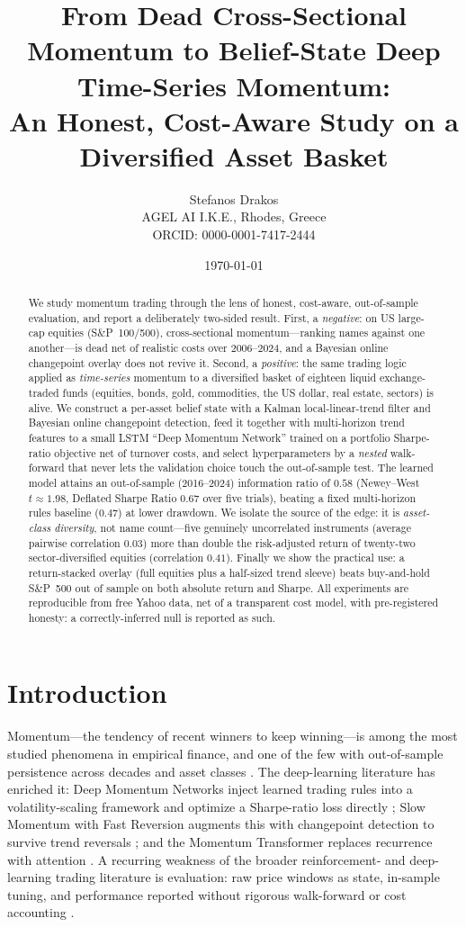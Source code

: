 \documentclass[11pt,a4paper]{article}
\title{\textbf{From Dead Cross-Sectional Momentum to Belief-State Deep\\
Time-Series Momentum:\\
An Honest, Cost-Aware Study on a Diversified Asset Basket}}
\author{Stefanos Drakos\\
\small AGEL AI I.K.E., Rhodes, Greece\\
\small ORCID: 0000-0001-7417-2444}
\date{\today}
\theoremstyle{definition}
\begin{document}
\maketitle

\begin{abstract}
We study momentum trading through the lens of honest, cost-aware, out-of-sample evaluation,
and report a deliberately two-sided result. First, a \emph{negative}: on US large-cap equities
(S\&P~100/500), cross-sectional momentum---ranking names against one another---is dead net of
realistic costs over 2006--2024, and a Bayesian online changepoint overlay does not revive it.
Second, a \emph{positive}: the same trading logic applied as \emph{time-series} momentum to a
diversified basket of eighteen liquid exchange-traded funds (equities, bonds, gold, commodities,
the US dollar, real estate, sectors) is alive. We construct a per-asset belief state with a
Kalman local-linear-trend filter and Bayesian online changepoint detection, feed it together with
multi-horizon trend features to a small LSTM ``Deep Momentum Network'' trained on a portfolio
Sharpe-ratio objective net of turnover costs, and select hyperparameters by a \emph{nested}
walk-forward that never lets the validation choice touch the out-of-sample test. The learned
model attains an out-of-sample (2016--2024) information ratio of $0.58$ (Newey--West
$t\approx 1.98$, Deflated Sharpe Ratio $0.67$ over five trials), beating a fixed multi-horizon
rules baseline ($0.47$) at lower drawdown. We isolate the source of the edge: it is
\emph{asset-class diversity}, not name count---five genuinely uncorrelated instruments
(average pairwise correlation $0.03$) more than double the risk-adjusted return of twenty-two
sector-diversified equities (correlation $0.41$). Finally we show the practical use: a
return-stacked overlay (full equities plus a half-sized trend sleeve) beats buy-and-hold S\&P~500
out of sample on both absolute return and Sharpe. All experiments are reproducible from free Yahoo
data, net of a transparent cost model, with pre-registered honesty: a correctly-inferred null is
reported as such.
\end{abstract}

\section{Introduction}
\label{sec:intro}

Momentum---the tendency of recent winners to keep winning---is among the most studied phenomena in
empirical finance, and one of the few with out-of-sample persistence across decades and asset
classes \cite{moskowitz2012}. The deep-learning literature has enriched it: Deep Momentum Networks
inject learned trading rules into a volatility-scaling framework and optimize a Sharpe-ratio loss
directly \cite{lim2019}; Slow Momentum with Fast Reversion augments this with changepoint detection
to survive trend reversals \cite{wood2021}; and the Momentum Transformer replaces recurrence with
attention \cite{wood2021mt}. A recurring weakness of the broader reinforcement- and deep-learning
trading literature is evaluation: raw price windows as state, in-sample tuning, and performance
reported without rigorous walk-forward or cost accounting \cite{hambly2023}.
\end{document}
